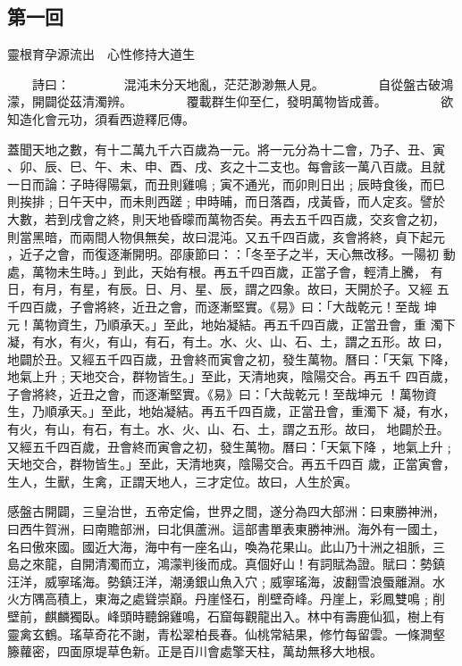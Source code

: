   \begin{pinyinscope}{\myfontt \section{第一回}     靈根育孕源流出　心性修持大道生


　　詩曰：
　　　　混沌未分天地亂，茫茫渺渺無人見。
　　　　自從盤古破鴻濛，開闢從茲清濁辨。
　　　　覆載群生仰至仁，發明萬物皆成善。
　　　　欲知造化會元功，須看西遊釋厄傳。


蓋聞天地之數，有十二萬九千六百歲為一元。將一元分為十二會，乃子、丑、寅
、卯、辰、巳、午、未、申、酉、戌、亥之十二支也。每會該一萬八百歲。且就
一日而論：子時得陽氣，而丑則雞鳴﹔寅不通光，而卯則日出﹔辰時食後，而巳
則挨排﹔日午天中，而未則西蹉﹔申時晡，而日落酉，戌黃昏，而人定亥。譬於
大數，若到戌會之終，則天地昏曚而萬物否矣。再去五千四百歲，交亥會之初，
則當黑暗，而兩間人物俱無矣，故曰混沌。又五千四百歲，亥會將終，貞下起元
，近子之會，而復逐漸開明。邵康節曰：：「冬至子之半，天心無改移。一陽初
動處，萬物未生時。」到此，天始有根。再五千四百歲，正當子會，輕清上騰，
有日，有月，有星，有辰。日、月、星、辰，謂之四象。故曰，天開於子。又經
五千四百歲，子會將終，近丑之會，而逐漸堅實。《易》曰：「大哉乾元！至哉
坤元！萬物資生，乃順承天。」至此，地始凝結。再五千四百歲，正當丑會，重
濁下凝，有水，有火，有山，有石，有土。水、火、山、石、土，謂之五形。故
曰，地闢於丑。又經五千四百歲，丑會終而寅會之初，發生萬物。曆曰：「天氣
下降，地氣上升﹔天地交合，群物皆生。」至此，天清地爽，陰陽交合。再五千
四百歲，子會將終，近丑之會，而逐漸堅實。《易》曰：「大哉乾元！至哉坤元
！萬物資生，乃順承天。」至此，地始凝結。再五千四百歲，正當丑會，重濁下
凝，有水，有火，有山，有石，有土。水、火、山、石、土，謂之五形。故曰，
地闢於丑。又經五千四百歲，丑會終而寅會之初，發生萬物。曆曰：「天氣下降
，地氣上升﹔天地交合，群物皆生。」至此，天清地爽，陰陽交合。再五千四百
歲，正當寅會，生人，生獸，生禽，正謂天地人，三才定位。故曰，人生於寅。

感盤古開闢，三皇治世，五帝定倫，世界之間，遂分為四大部洲：曰東勝神洲，
曰西牛賀洲，曰南贍部洲，曰北俱蘆洲。這部書單表東勝神洲。海外有一國土，
名曰傲來國。國近大海，海中有一座名山，喚為花果山。此山乃十洲之祖脈，三
島之來龍，自開清濁而立，鴻濛判後而成。真個好山！有詞賦為證。賦曰：勢鎮
汪洋，威寧瑤海。勢鎮汪洋，潮湧銀山魚入穴﹔威寧瑤海，波翻雪浪蜃離淵。水
火方隅高積上，東海之處聳崇巔。丹崖怪石，削壁奇峰。丹崖上，彩鳳雙鳴﹔削
壁前，麒麟獨臥。峰頭時聽錦雞鳴，石窟每觀龍出入。林中有壽鹿仙狐，樹上有
靈禽玄鶴。瑤草奇花不謝，青松翠柏長春。仙桃常結果，修竹每留雲。一條澗壑
籐蘿密，四面原堤草色新。正是百川會處擎天柱，萬劫無移大地根。

}
\end{pinyinscope}
